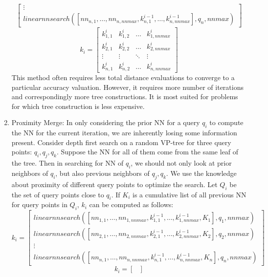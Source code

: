 \documentclass[11pt]{article}
\begin{document}
\begin{enumerate}
\begin{equation}
\begin{bmatrix}
\vdots \\
linearnnsearch([nn_{n,1},\dots, nn_{n,nnmax}, k^{i-1}_{n,1},\dots, k^{i-1}_{n,nnmax}],q_n,nnmax)
\end{bmatrix}
\end{equation}
\begin{equation}
k_i = 
\begin{bmatrix}
k^{i}_{1,1} & k^{i}_{1,2} & \dots & k^{i}_{1,nnmax} \\
k^{i}_{2,1} & k^{i}_{2,2} & \dots & k^{i}_{2,nnmax} \\
\vdots   & \vdots   & \ddots & \vdots \\
k^{i}_{n,1} & k^{i}_{n,2} & \dots & k^{i}_{n,nnmax}
\end{bmatrix}
\end{equation}
This method often requires less total distance evaluations to converge to a particular accuracy valuation. However, it requires more number of iterations and correspondingly more tree constructions. It is most suited for problems for which tree construction is less expensive. 
\item Proximity Merge: In only considering the prior NN for a query $q_i$ to compute the NN for the current iteration, we are inherently losing some information present. Consider depth first search on a random VP-tree for three query points: $q_i, q_j, q_k$. Suppose the NN for all of them come from the same leaf of the tree. Then in searching for NN of $q_i$, we should not only look at prior neighbors of $q_i$, but also previous neighbors of $q_j,q_k$. We use the knowledge about proximity of different query points to optimize the search. Let $Q_i$ be the set of query points close to $q_i$. If $K_i$ is a cumulative list of all previous NN for query points in $Q_i$, $k_i$ can be computed as follows: 
\begin{equation}
k_i = 
\begin{bmatrix}
linearnnsearch([nn_{1,1},\dots, nn_{1,nnmax}, k^{i-1}_{1,1},\dots, k^{i-1}_{1,nnmax},K_1],q_1,nnmax) \\
linearnnsearch([nn_{2,1},\dots, nn_{2,nnmax}, k^{i-1}_{2,1},\dots, k^{i-1}_{2,nnmax}, K_2],q_2,nnmax) \\
\vdots \\
linearnnsearch([nn_{n,1},\dots, nn_{n,nnmax}, k^{i-1}_{n,1},\dots, k^{i-1}_{n,nnmax}, K_n],q_n,nnmax)
\end{bmatrix}
\end{equation}
\begin{equation}
k_i = 
\begin{bmatrix}

\end{bmatrix}
\end{equation}
\end{enumerate}
\end{document}
